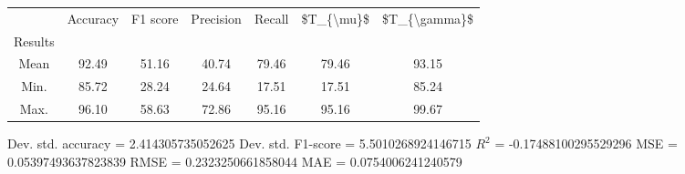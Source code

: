 \begin{tabular}{|c|c|c|c|c|c|c|}
\toprule
{} &  Accuracy &  F1 score &  Precision &  Recall &  \$T\_\{\textbackslash mu\}\$ &  \$T\_\{\textbackslash gamma\}\$ \\
Results &           &           &            &         &            &               \\
\hline
Mean    &     92.49 &     51.16 &      40.74 &   79.46 &      79.46 &         93.15 \\
Min.    &     85.72 &     28.24 &      24.64 &   17.51 &      17.51 &         85.24 \\
Max.    &     96.10 &     58.63 &      72.86 &   95.16 &      95.16 &         99.67 \\
\bottomrule
\end{tabular}

 Dev. std. accuracy = 2.414305735052625
 Dev. std. F1-score = 5.5010268924146715
 $R^2$ = -0.17488100295529296
 MSE = 0.05397493637823839
 RMSE = 0.2323250661858044
 MAE = 0.0754006241240579
